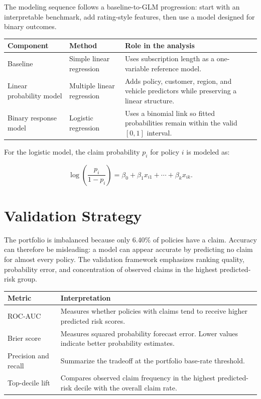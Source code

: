 \documentclass[11pt,letterpaper]{article}
\begin{document}
The modeling sequence follows a baseline-to-GLM progression: start with an interpretable benchmark, add rating-style features, then use a model designed for binary outcomes.

\begin{tabularx}{\textwidth}{B{1.8in}L{1.9in}X}
\toprule
Component & Method & Role in the analysis \\
\midrule
Baseline & Simple linear regression & Uses subscription length as a one-variable reference model. \\
Linear probability model & Multiple linear regression & Adds policy, customer, region, and vehicle predictors while preserving a linear structure. \\
Binary response model & Logistic regression & Uses a binomial link so fitted probabilities remain within the valid \([0,1]\) interval. \\
\bottomrule
\end{tabularx}

For the logistic model, the claim probability \(p_i\) for policy \(i\) is modeled as:

\[
\log\left(\frac{p_i}{1-p_i}\right)
= \beta_0 + \beta_1x_{i1} + \cdots + \beta_kx_{ik}.
\]

\section{Validation Strategy}

The portfolio is imbalanced because only 6.40\% of policies have a claim. Accuracy can therefore be misleading: a model can appear accurate by predicting no claim for almost every policy. The validation framework emphasizes ranking quality, probability error, and concentration of observed claims in the highest predicted-risk group.

\begin{tabularx}{\textwidth}{B{1.55in}X}
\toprule
Metric & Interpretation \\
\midrule
ROC-AUC & Measures whether policies with claims tend to receive higher predicted risk scores. \\
Brier score & Measures squared probability forecast error. Lower values indicate better probability estimates. \\
Precision and recall & Summarize the tradeoff at the portfolio base-rate threshold. \\
Top-decile lift & Compares observed claim frequency in the highest predicted-risk decile with the overall claim rate. \\
\bottomrule
\end{tabularx}
\end{document}

